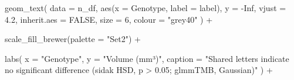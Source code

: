 \documentclass[
  letterpaper,
  DIV=11,
  numbers=noendperiod]{scrartcl}
\newenvironment{Shaded}{\begin{snugshade}}{\end{snugshade}}
\newcommand{\AttributeTok}[1]{\textcolor[rgb]{0.40,0.45,0.13}{#1}}
\newcommand{\ConstantTok}[1]{\textcolor[rgb]{0.56,0.35,0.01}{#1}}
\newcommand{\DecValTok}[1]{\textcolor[rgb]{0.68,0.00,0.00}{#1}}
\newcommand{\FloatTok}[1]{\textcolor[rgb]{0.68,0.00,0.00}{#1}}
\newcommand{\FunctionTok}[1]{\textcolor[rgb]{0.28,0.35,0.67}{#1}}
\newcommand{\NormalTok}[1]{\textcolor[rgb]{0.00,0.23,0.31}{#1}}
\newcommand{\SpecialCharTok}[1]{\textcolor[rgb]{0.37,0.37,0.37}{#1}}
\newcommand{\StringTok}[1]{\textcolor[rgb]{0.13,0.47,0.30}{#1}}
\begin{document}
\begin{Shaded}
\begin{Highlighting}[]
  \FunctionTok{geom\_text}\NormalTok{(}
    \AttributeTok{data        =}\NormalTok{ n\_df,}
    \FunctionTok{aes}\NormalTok{(}\AttributeTok{x =}\NormalTok{ Genotype, }\AttributeTok{label =}\NormalTok{ label),}
    \AttributeTok{y           =} \SpecialCharTok{{-}}\ConstantTok{Inf}\NormalTok{,}
    \AttributeTok{vjust       =} \FloatTok{4.2}\NormalTok{,}
    \AttributeTok{inherit.aes =} \ConstantTok{FALSE}\NormalTok{,}
    \AttributeTok{size        =} \DecValTok{6}\NormalTok{,}
    \AttributeTok{colour      =} \StringTok{"grey40"}
\NormalTok{  ) }\SpecialCharTok{+}
  
  \FunctionTok{scale\_fill\_brewer}\NormalTok{(}\AttributeTok{palette =} \StringTok{"Set2"}\NormalTok{) }\SpecialCharTok{+}

  \FunctionTok{labs}\NormalTok{(}
    \AttributeTok{x       =} \StringTok{"Genotype"}\NormalTok{,}
    \AttributeTok{y       =} \StringTok{"Volume (mm³)"}\NormalTok{,}
    \AttributeTok{caption =} \StringTok{"Shared letters indicate no significant difference (sidak HSD, p \textgreater{} 0.05; glmmTMB, Gaussian)"}
\NormalTok{  ) }\SpecialCharTok{+}
  

\end{Highlighting}
\end{Shaded}
\end{document}
